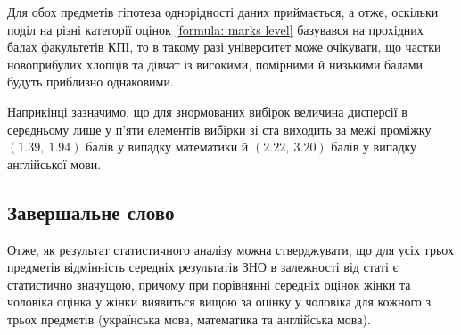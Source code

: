 \documentclass[a4paper,14pt]{extarticle} %
\numberwithin{equation}{section}
\begin{document}
Для обох предметів гіпотеза однорідності даних приймається, а отже, оскільки поділ на різні категорії оцінок 
\eqref{formula: marks level} базувався на прохідних балах факультетів КПІ, то в такому разі університет може 
очікувати, що частки новоприбулих хлопців та дівчат із високими, помірними й низькими балами будуть приблизно 
однаковими.

Наприкінці зазначимо, що для знормованих вибірок величина дисперсії в середньому лише у п'яти елементів 
вибірки зі ста виходить за межі проміжку $(1.39,\ 1.94)$ балів у випадку математики й $(2.22,\ 3.20)$ балів у 
випадку англійської мови.

\subsection*{Завершальне слово}

Отже, як результат статистичного аналізу можна стверджувати, що для усіх трьох предметів відмінність середніх 
результатів ЗНО в залежності від статі є статистично значущою, причому при порівнянні середніх оцінок жінки 
та чоловіка оцінка у жінки виявиться вищою за оцінку у чоловіка для кожного з трьох предметів (українська мова, 
математика та англійська мова).
\end{document}

